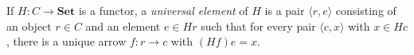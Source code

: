 If $H: C \to \mathbf{Set}$ is a functor, a \emph{universal element} of $H$ is a pair $\langle r, e \rangle$ consisting of an object $r \in C$ and an element $e \in Hr$ such that for every pair $\langle c, x \rangle$ with $x \in Hc$, there is a unique arrow $f: r \to c$ with $(Hf)e = x$.
